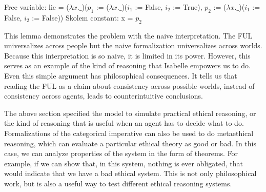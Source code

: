 \begin{isabellebody}
{  Free variable:
    lie = ($\lambda x. \_$)($p_1$ := ($\lambda x. \_$)($i_1$ := False, $i_2$ := True), $p_2$ := ($\lambda x. \_$)($i_1$ := False, $i_2$ := False))
  Skolem constant:
    x = $p_2$ \color{black}%
}%
\endisatagproof
{\isafoldproof}%
%
\isadelimproof
%
\endisadelimproof
%
\begin{isamarkuptext}%
This lemma demonstrates the problem with the naive interpretation. The FUL universalizes across people
but the naive formalization universalizes across worlds. Because this interpretation is so naive, it is 
limited in its power. However, this serves as an example of the kind of reasoning that 
Isabelle empowers us to do. Even this simple argument has philosophical consequences. It tells us that
reading the FUL as a claim about consistency across possible worlds, instead of consistency across 
agents, leads to counterintuitive conclusions.%
\end{isamarkuptext}\isamarkuptrue%
%
\isadelimdocument
%
\endisadelimdocument
%
\isatagdocument
%
\isamarkuptrue%
%
\endisatagdocument
{\isafolddocument}%
%
\isadelimdocument
%
\endisadelimdocument
%
\begin{isamarkuptext}%
The above section specified the model to simulate practical ethical reasoning, or the kind of 
reasoning that is useful when an agent has to decide what to do. Formalizations of the categorical 
imperative can also be used to do metaethical reasoning, which can evaluate a particular ethical theory
as good or bad. In this case, we can analyze properties of the system in the form of theorems. For example,
if we can show that, in this system, nothing is ever obligated, that would indicate that we have a bad 
ethical system. This is not only philosophical work, but is also a useful way to test different ethical
reasoning systems.


\end{isamarkuptext}
\end{isabellebody}
